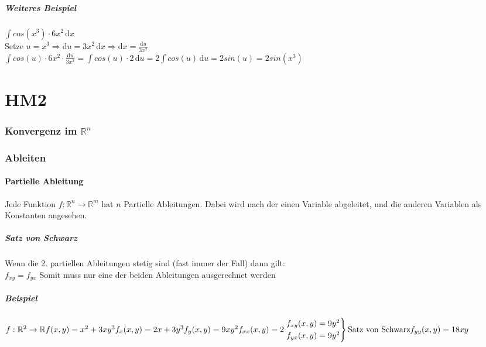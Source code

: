 \documentclass[a4paper,portrait]{scrartcl}
\begin{document}
\subsubsection*{Weiteres Beispiel}
$ \int \!cos(x^3) \cdot 6x^2 \,\mathrm{d}x $ \\
Setze $ u = x^3 \Rightarrow \mathrm{d}u = 3x^2 \,\mathrm{d}x \Rightarrow \mathrm{d}x = \frac{\mathrm{d}u}{3x^2}$ \\
$ \int \!cos(u) \cdot 6x^2 \cdot \frac{\mathrm{d}u}{3x^2} = \int \!cos(u) \cdot 2 \,\mathrm{d}u = 2 \int \!cos(u) \,\mathrm{d}u = 2 sin(u) = 2 sin(x^3)$



\clearpage
\part*{HM2}
\section{Konvergenz im $\mathbb{R}^n$}
\section{Ableiten}
\subsection{Partielle Ableitung}
Jede Funktion $f: \mathbb{R}^n \rightarrow \mathbb{R}^m$ hat $n$ Partielle Ableitungen.
Dabei wird nach der einen Variable abgeleitet, und die anderen Variablen als Konstanten angesehen.
\subsubsection{Satz von Schwarz}
Wenn die 2. partiellen Ableitungen stetig sind (fast immer der Fall) dann gilt: \\
$ f_{xy} = f_{yx} $ Somit muss nur eine der beiden Ableitungen ausgerechnet werden
\subsubsection*{Beispiel}
$f: \mathbb{R}^2 \rightarrow \mathbb{R} \\
f(x,y) = x^2 + 3xy^3 \\
f_x(x,y) = 2x + 3y^3 \\
f_y(x,y) = 9xy^2 \\ \\
f_{xx}(x,y) = 2\\
\begin{rcases*}
	f_{xy}(x,y) = 9y^2 \\
	f_{yx}(x,y) = 9y^2 
\end{rcases*}
\text{Satz von Schwarz}\\
f_{yy}(x,y) = 18xy$
\end{document}
